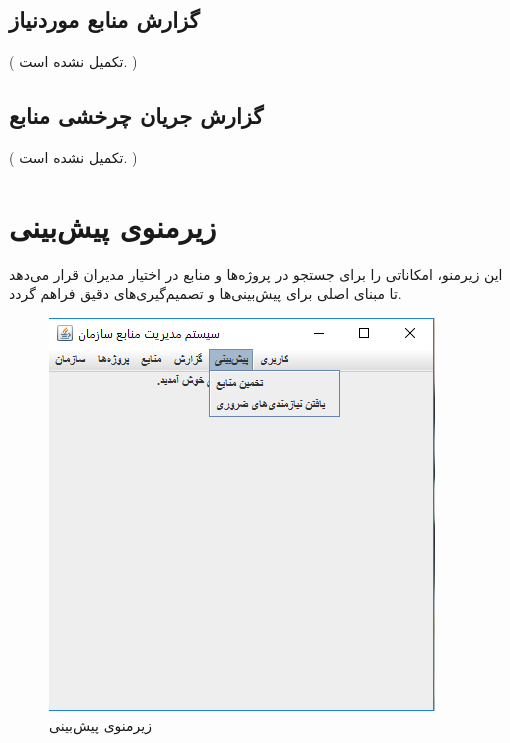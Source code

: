 \subsection{گزارش منابع موردنیاز}
({\color{red} تکمیل نشده است. })

\subsection{گزارش جریان چرخشی منابع }
({\color{red} تکمیل نشده است. })

\newpage
\section{زیرمنوی پیش‌بینی}
این زیرمنو، امکاناتی را برای جستجو در پروژه‌ها و منابع در اختیار مدیران قرار می‌دهد تا مبنای اصلی برای پیش‌بینی‌ها و تصمیم‌گیری‌های دقیق فراهم گردد.
	\begin{figure}[H]
		\centering
		\includegraphics[scale=0.7]{img/manual/estSubmenu}
		\caption{زیرمنوی پیش‌بینی}
	\end{figure}

